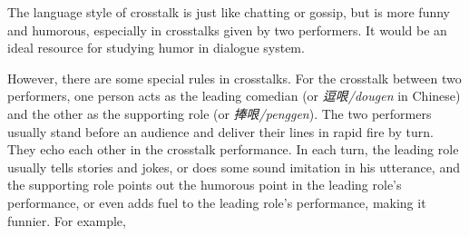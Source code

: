 \documentclass[letterpaper]{article} %
\begin{document}
\begin{CJK*}{UTF8}{gbsn}
The language style of crosstalk is just like chatting or gossip, but is more funny and humorous, especially in crosstalks given by two performers. It would be an ideal resource for studying humor in dialogue system.

However, there are some special rules in crosstalks. %
For the crosstalk between two performers, one person acts as the leading comedian (or {\it 逗哏/dougen} in Chinese) and the other as the supporting role (or {\it 捧哏/penggen}). The two performers usually stand before an audience and  deliver their lines in rapid fire by turn. They echo each other in the crosstalk performance. In each turn, the leading role usually tells stories and jokes, or does some sound imitation in his utterance, and the supporting role points out the humorous point in the leading role's performance, or even adds fuel to the leading role's performance, making it funnier. For example, 


\end{CJK*}
\end{document}
